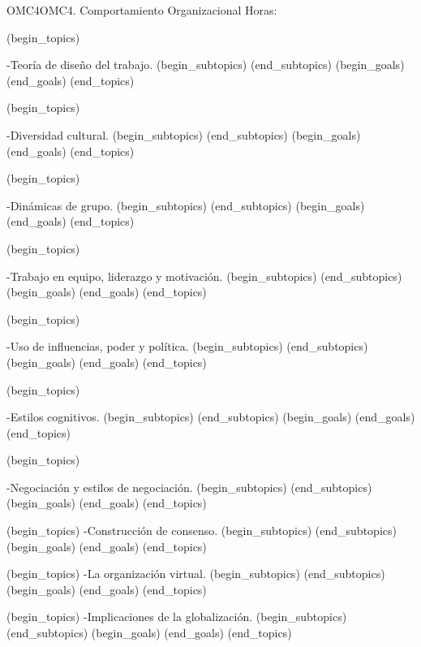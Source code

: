 \begin{BKL2}{OMC4}{OMC4. Comportamiento Organizacional}
Horas:
 
(begin_topics)

-Teoría de diseño del trabajo.
(begin_subtopics)
(end_subtopics)
(begin_goals)
(end_goals)
(end_topics)

 

(begin_topics)

-Diversidad cultural.
(begin_subtopics)
(end_subtopics)
(begin_goals)
(end_goals)
(end_topics)

 

(begin_topics)

-Dinámicas de grupo.
(begin_subtopics)
(end_subtopics)
(begin_goals)
(end_goals)
(end_topics)

 

(begin_topics)

-Trabajo en equipo, liderazgo y motivación.
(begin_subtopics)
(end_subtopics)
(begin_goals)
(end_goals)
(end_topics)

 

(begin_topics)

-Uso de influencias, poder y política.
(begin_subtopics)
(end_subtopics)
(begin_goals)
(end_goals)
(end_topics)

 

(begin_topics)

-Estilos cognitivos.
(begin_subtopics)
(end_subtopics)
(begin_goals)
(end_goals)
(end_topics)

 

(begin_topics)

-Negociación y estilos de negociación.
(begin_subtopics)
(end_subtopics)
(begin_goals)
(end_goals)
(end_topics)

 

(begin_topics)
-Construcción de consenso.
(begin_subtopics)
(end_subtopics)
(begin_goals)
(end_goals)
(end_topics)

(begin_topics)
-La organización virtual.
(begin_subtopics)
(end_subtopics)
(begin_goals)
(end_goals)
(end_topics)

(begin_topics)
-Implicaciones de la globalización.
(begin_subtopics)
(end_subtopics)
(begin_goals)
(end_goals)
(end_topics)

\end{BKL2}



